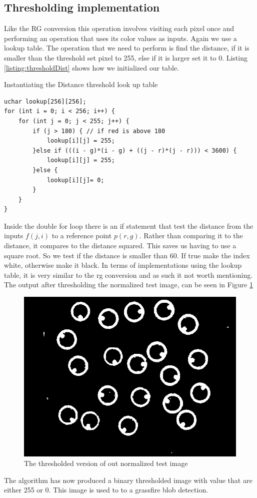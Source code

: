 \subsection{Thresholding implementation}
Like the RG conversion this operation involves visiting each pixel once and performing an operation that uses its color values as inputs. Again we use a lookup table. The operation that we need to perform is find the distance, if it is smaller than the threshold set pixel to 255, else if it is larger set it to 0. Listing \ref{listing:thresholdDist} shows how we initialized our table.

\begin{listing}[H]
	\caption{Instantiating the Distance threshold look up table}
	\label{listing:thresholdDist}
	\begin{verbatim}
uchar lookup[256][256];
for (int i = 0; i < 256; i++) {
	for (int j = 0; j < 255; j++) {
		if (j > 180) { // if red is above 180
			lookup[i][j] = 255;
		}else if (((i - g)*(i - g) + ((j - r)*(j - r))) < 3600) {
			lookup[i][j] = 255;
		}else {
			lookup[i][j]= 0;
		}
	}
}
\end{verbatim}
\end{listing}

Inside the double for loop there is an if statement that test the distance from the inputs $f(j,i)$ to a reference point $p(r,g)$. Rather than comparing it to the distance, it compares to the distance squared. This saves us having to use a square root. So we test if the distance is smaller than 60. If true make the index white, otherwise make it black. 
In terms of implementations using the lookup table, it is very similar to the rg conversion and as such it not worth mentioning. The output after thresholding the normalized test image, can be seen in Figure \ref{fig:thsnapshot}\\
\begin{figure}[H]
	\centering
	\includegraphics[width=0.6\linewidth]{figure/Analysis/thresholded.png}
	\caption{The thresholded version of out normalized test image}
	\label{fig:thsnapshot}
\end{figure} 
The algorithm has now produced a binary thresholded image with value that are either 255 or 0. This image is used to to a grassfire blob detection. 
